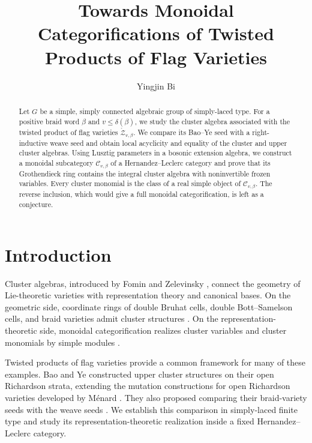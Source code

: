 \documentclass[12pt, reqno]{amsart}
\theoremstyle{plain}
\theoremstyle{definition}
\numberwithin{equation}{section}
\begin{document}
\title[Towards categorifications of twisted products]{Towards Monoidal Categorifications of Twisted Products of Flag Varieties}
\author{Yingjin Bi}
\address{Department of Mathematics, Harbin Engineering University}
\date{}

\begin{abstract}
Let $G$ be a simple, simply connected algebraic group of simply-laced type.
For a positive braid word $\beta$ and $v\le\delta(\beta)$, we study the
cluster algebra associated with the twisted product of flag varieties
$\mathring{\mathcal Z}_{v,\beta}$. We compare its Bao--Ye seed with a
right-inductive weave seed and obtain local acyclicity and equality of
the cluster and upper cluster algebras. Using Lusztig parameters in a
bosonic extension algebra, we construct a monoidal subcategory
$\mathscr C_{v,\beta}$ of a Hernandez--Leclerc category and prove that
its Grothendieck ring contains the integral cluster algebra with
noninvertible frozen variables. Every cluster monomial is the class of
a real simple object of $\mathscr C_{v,\beta}$. The reverse inclusion,
which would give a full monoidal categorification, is left as a conjecture.
\end{abstract}

\maketitle
\tableofcontents


\section{Introduction}

Cluster algebras, introduced by Fomin and Zelevinsky
\cite{fomin2002cluster}, connect the geometry of Lie-theoretic varieties
with representation theory and canonical bases. On the geometric side,
coordinate rings of double Bruhat cells, double Bott--Samelson cells,
and braid varieties admit cluster structures
\cite{shen2021cluster,casals2025cluster,galashin2025braid}.
On the representation-theoretic side, monoidal categorification realizes
cluster variables and cluster monomials by simple modules
\cite{hernandez2010cluster,kang2018monoidal,kashiwara2024monoidal,
kashiwara2025monoidal}.

Twisted products of flag varieties provide a common framework for many
of these examples. Bao and Ye \cite{bao2025upper} constructed upper
cluster structures on their open Richardson strata, extending the
mutation constructions for open Richardson varieties developed by
M\'enard \cite{menard2022cluster}. They also proposed comparing their
braid-variety seeds with the weave seeds
\cite[Section~1.2]{bao2025upper}. We establish this comparison in
simply-laced finite type and study its representation-theoretic realization
inside a fixed Hernandez--Leclerc category.
\end{document}
